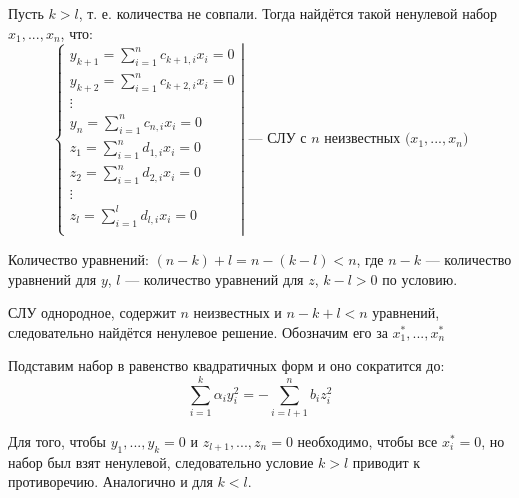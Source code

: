 \documentclass[12pt]{article}
\begin{document}
Пусть $k > l$, т. е. количества не совпали. Тогда найдётся такой ненулевой набор $x_1, ..., x_n$, что:
\[
    \left.\begin{cases}
        y_{k + 1} = \sum_{i = 1}^{n}c_{k + 1,i}x_i = 0 \\
        y_{k + 2} = \sum_{i = 1}^{n}c_{k + 2,i}x_i = 0 \\
        \vdots                                         \\
        y_{n} = \sum_{i = 1}^{n}c_{n,i}x_i = 0         \\
        z_{1} = \sum_{i = 1}^{n}d_{1,i}x_i = 0         \\
        z_{2} = \sum_{i = 1}^{n}d_{2,i}x_i = 0         \\
        \vdots                                         \\
        z_{l} = \sum_{i = 1}^{l}d_{l,i}x_i = 0         \\
    \end{cases}\right|
    \text{ — СЛУ с $n$ неизвестных ($x_1, ..., x_n$)}
\]

Количество уравнений: $(n - k) + l = n - (k - l) < n$, где $n - k$ — количество уравнений для $y$, $l$ — количество уравнений для $z$, $k - l > 0$ по условию.

СЛУ однородное, содержит $n$ неизвестных и $n - k + l < n$ уравнений, следовательно найдётся ненулевое решение. Обозначим его за $x_1^*, ..., x_n^*$

Подставим набор в равенство квадратичных форм и оно сократится до:
\[
    \sum^k_{i=1}\alpha_{i}y_i^2 = -\sum_{i = l + 1}^nb_iz_i^2
\]

Для того, чтобы $y_{1}, ..., y_k = 0$ и $z_{l + 1}, ..., z_n = 0$ необходимо, чтобы все $x_i^* = 0$, но набор был взят ненулевой, следовательно условие $k > l$ приводит к противоречию. Аналогично и для $k < l$.
\end{document}
